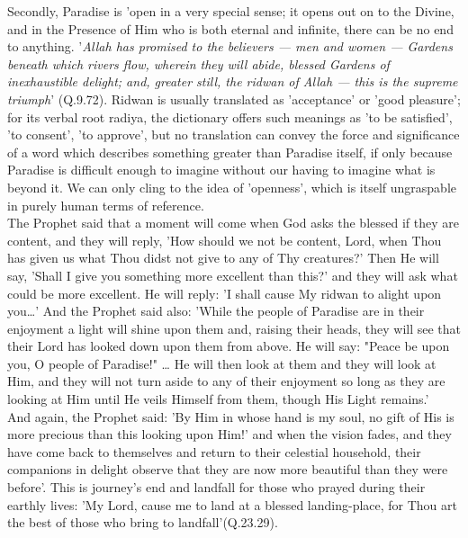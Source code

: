 \documentclass[11pt, b5paper, twoside]{book}
\begin{document}
Secondly, Paradise is 'open in a very special sense; it opens out on to the Divine, and in the 
Presence of Him who is both eternal and infinite, there can be no end to anything. '\emph{Allah has 
promised to the believers --- men and women --- Gardens beneath which rivers flow, wherein they will 
abide, blessed Gardens of inexhaustible delight; and, greater still, the ridwan of Allah --- this is 
the supreme triumph}' (Q.9.72). Ridwan is usually translated as 'acceptance' or 'good pleasure'; for 
its verbal root radiya, the dictionary offers such meanings as 'to be satisfied', 'to consent', 'to 
approve', but no translation can convey the force and significance of a word which describes 
something greater than Paradise itself, if only because Paradise is difficult enough to imagine 
without our having to imagine what is beyond it. We can only cling to the idea of 'openness', which 
is itself ungraspable in purely human terms of reference. \\

The Prophet said that a moment will come when God asks the blessed if they are content, and they will 
reply, 'How should we not be content, Lord, when Thou has given us what Thou didst not give to any of 
Thy creatures?' Then He will say, 'Shall I give you something more excellent than this?' and they 
will ask what could be more excellent. He will reply: 'I shall cause My ridwan to alight upon you\ldots{}' 
And the Prophet said also: 'While the people of Paradise are in their enjoyment a light will shine 
upon them and, raising their heads, they will see that their Lord has looked down upon them from 
above. He will say: "Peace be upon you, O people of Paradise!" \ldots{} He will then look at them and they 
will look at Him, and they will not turn aside to any of their enjoyment so long as they are looking 
at Him until He veils Himself from them, though His Light remains.' \\

And again, the Prophet said: 'By Him in whose hand is my soul, no gift of His is more precious than 
this looking upon Him!' and when the vision fades, and they have come back to themselves and return 
to their celestial household, their companions in delight observe that they are now more beautiful 
than they were before'. This is journey's end and landfall for those who prayed during their earthly 
lives: 'My Lord, cause me to land at a blessed landing-place, for Thou art the best of those who 
bring to landfall'(Q.23.29). \\
\end{document}
